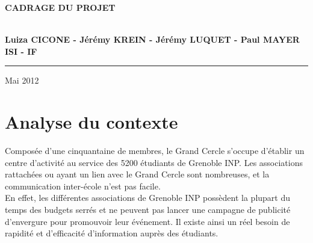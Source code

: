 \documentclass[a4paper,11pt]{article}
\begin{document}
\begin{titlepage}
\begin{center}
\begin{center}
{\Huge \bf CADRAGE DU PROJET}


\end{center}


\vspace{1cm}

\begin{center}
$ $\\
\large{ \textbf{Luiza CICONE - Jérémy KREIN - Jérémy LUQUET - Paul MAYER}}\\
\large{ \textbf{ISI - IF}}
$ $\\
\end{center}
\rule{\linewidth}{.5pt}


\vfill


{\large Mai 2012}

\end{center}
\end{titlepage}


\newpage


%
\newenvironment{myenumerate}{%
  \edef\backupindent{\the\parindent}%
  \enumerate%
  \setlength{\parindent}{\backupindent}%
}{\endenumerate}

%

\renewcommand{\appendixtocname}{Annexes}


\vspace*{\fill}
\section{\bf{Analyse du contexte}}
\indent Composée d'une cinquantaine de membres, le Grand Cercle s'occupe d'établir un centre d’activité au service des 5200 étudiants de Grenoble INP. Les associations rattachées ou ayant un lien avec le Grand Cercle sont nombreuses, et la communication inter-école n'est pas facile.\\
En effet, les différentes associations de Grenoble INP possèdent la plupart du temps des budgets serrés et ne peuvent pas lancer une campagne de publicité d'envergure pour promouvoir leur événement. Il existe ainsi un réel besoin de rapidité et d'efficacité d'information auprès des étudiants.
\end{document}
